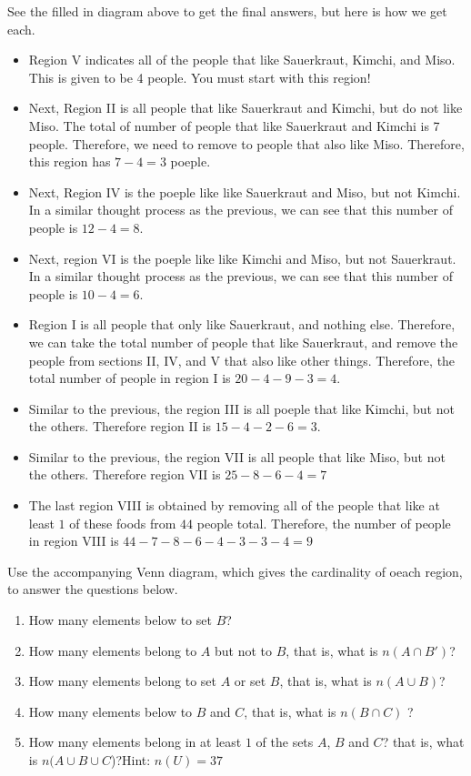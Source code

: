 \documentclass[addpoints,12pt]{exam}
\begin{document}
\begin{questions}
\begin{solution}
    See the filled in diagram above to get the final answers, but here is how we get each. 
		\begin{itemize}
		    \item Region V indicates all of the people that like Sauerkraut, Kimchi, and Miso. This is given to be 4 people. You must start with this region! 
				\item Next, Region II is all people that like Sauerkraut and Kimchi, but do not like Miso. The total of number of people that like Sauerkraut and Kimchi is 7 people. Therefore, we need to remove to people that also like Miso. Therefore, this region has $7-4=3$ poeple. 
				\item Next, Region  IV is the poeple like like Sauerkraut and Miso, but not Kimchi. In a similar thought process as the previous, we can see that this number of people is $12 - 4 = 8 $.  
				\item Next, region VI is the poeple like like Kimchi and Miso, but not Sauerkraut. In a similar thought process as the previous, we can see that this number of people is $10 - 4 = 6 $.  
				\item Region I is all people that only like Sauerkraut, and nothing else. Therefore, we can take the total number of people that like Sauerkraut, and remove the people from sections II, IV, and V that also like other things. Therefore, the total number of people in region I is  $20-4-9-3 = 4$. 
				\item Similar to the previous, the region III is all poeple that like Kimchi, but not the others. Therefore region II is $15-4-2-6= 3$. 
				\item Similar to the previous, the region VII is all people that like Miso, but not the others. Therefore region VII is $25-8-6-4 = 7$
				\item The last region VIII is obtained by removing all of the people that like at least $1$ of these foods from $44$ people total. Therefore, the number of people in region VIII is $44-7-8-6-4-3-3-4 = 9$

		\end{itemize}
\end{solution}
\newpage

\question Use the accompanying Venn diagram, which gives the cardinality of oeach region, to answer the questions below. 

\begin{enumerate}[label = \alph*)]
    \item How many elements below to set $B$? 
		\item How many elements belong to $A$ but not to $B$, that is, what is $n(A\cap B ')$?
		\item How many elements belong to set $A$ or set $B$,  that is, what is $n(A\cup B)$? 
		\item How many elements below to $B$ and $C$, that is, what is $n(B\cap C)$ ?
		\item How many elements belong in at least $1$ of the sets $A$, $B$ and $C$? that is, what is $n(A\cup B\cup C$)?Hint: $n(U) = 37$
\end{enumerate}


\end{questions}
\end{document}
